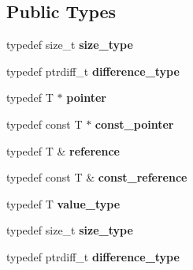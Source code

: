 \subsection*{Public Types}
\begin{DoxyCompactItemize}
\item 
\hypertarget{classStlGlobAlloc_a239af629eac486239d356e1dc5a30959}{typedef size\-\_\-t {\bfseries size\-\_\-type}}\label{classStlGlobAlloc_a239af629eac486239d356e1dc5a30959}

\item 
\hypertarget{classStlGlobAlloc_afe571cbed32854701f70f764663cb676}{typedef ptrdiff\-\_\-t {\bfseries difference\-\_\-type}}\label{classStlGlobAlloc_afe571cbed32854701f70f764663cb676}

\item 
\hypertarget{classStlGlobAlloc_a49d0cf793112f891d1e5e06d7bdf0dd3}{typedef T $\ast$ {\bfseries pointer}}\label{classStlGlobAlloc_a49d0cf793112f891d1e5e06d7bdf0dd3}

\item 
\hypertarget{classStlGlobAlloc_a6d251e17092aba785bcc631f73039727}{typedef const T $\ast$ {\bfseries const\-\_\-pointer}}\label{classStlGlobAlloc_a6d251e17092aba785bcc631f73039727}

\item 
\hypertarget{classStlGlobAlloc_a482578a8ffa21ad99df8e90254bc85a0}{typedef T \& {\bfseries reference}}\label{classStlGlobAlloc_a482578a8ffa21ad99df8e90254bc85a0}

\item 
\hypertarget{classStlGlobAlloc_a0050a176f991531451b62f91c18048c2}{typedef const T \& {\bfseries const\-\_\-reference}}\label{classStlGlobAlloc_a0050a176f991531451b62f91c18048c2}

\item 
\hypertarget{classStlGlobAlloc_adcd44d4048b6078b067fcad660a09d5c}{typedef T {\bfseries value\-\_\-type}}\label{classStlGlobAlloc_adcd44d4048b6078b067fcad660a09d5c}

\item 
\hypertarget{classStlGlobAlloc_a239af629eac486239d356e1dc5a30959}{typedef size\-\_\-t {\bfseries size\-\_\-type}}\label{classStlGlobAlloc_a239af629eac486239d356e1dc5a30959}

\item 
\hypertarget{classStlGlobAlloc_afe571cbed32854701f70f764663cb676}{typedef ptrdiff\-\_\-t {\bfseries difference\-\_\-type}}\label{classStlGlobAlloc_afe571cbed32854701f70f764663cb676}


\end{DoxyCompactItemize}
